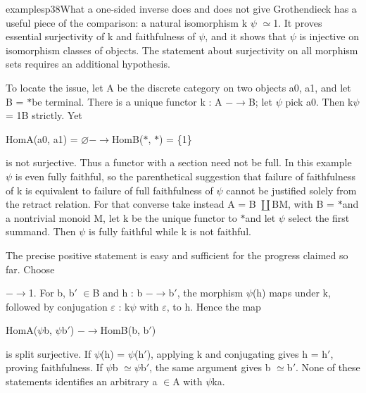 \begin{dcomment}{examples}{p38}{What a one-sided inverse does and does not give}
Grothendieck has a useful piece of the comparison: a natural isomorphism k\textasciimacron{} \ensuremath{\psi}\textasciimacron{} \ensuremath{\simeq}1. It proves essential surjectivity of k\textasciimacron{} and faithfulness of \ensuremath{\psi}\textasciimacron{}, and it shows that \ensuremath{\psi}\textasciimacron{} is injective on isomorphism classes of objects. The statement about surjectivity on all morphism sets requires an additional hypothesis.

To locate the issue, let A be the discrete category on two objects a0, a1, and let B = \ensuremath{*}be terminal. There is a unique functor k : A \ensuremath{-}\ensuremath{\to}B; let \ensuremath{\psi} pick a0. Then k\ensuremath{\psi} = 1B strictly. Yet

HomA(a0, a1) = \ensuremath{\varnothing}\ensuremath{-}\ensuremath{\to}HomB(\ensuremath{*}, \ensuremath{*}) = \{1\}

is not surjective. Thus a functor with a section need not be full. In this example \ensuremath{\psi} is even fully faithful, so the parenthetical suggestion that failure of faithfulness of k is equivalent to failure of full faithfulness of \ensuremath{\psi} cannot be justified solely from the retract relation. For that converse take instead A = B \ensuremath{\coprod}BM, with B = \ensuremath{*}and a nontrivial monoid M, let k be the unique functor to \ensuremath{*}and let \ensuremath{\psi} select the first summand. Then \ensuremath{\psi} is fully faithful while k is not faithful.

The precise positive statement is easy and sufficient for the progress claimed so far. Choose

\ensuremath{-}\ensuremath{\to}1. For b, b\ensuremath{\prime} \ensuremath{\in}B and h : b \ensuremath{-}\ensuremath{\to}b\ensuremath{\prime}, the morphism \ensuremath{\psi}(h) maps under k, followed by conjugation \ensuremath{\varepsilon} : k\ensuremath{\psi} with \ensuremath{\varepsilon}, to h. Hence the map

HomA(\ensuremath{\psi}b, \ensuremath{\psi}b\ensuremath{\prime}) \ensuremath{-}\ensuremath{\to}HomB(b, b\ensuremath{\prime})

is split surjective. If \ensuremath{\psi}(h) = \ensuremath{\psi}(h\ensuremath{\prime}), applying k and conjugating gives h = h\ensuremath{\prime}, proving faithfulness. If \ensuremath{\psi}b \ensuremath{\simeq}\ensuremath{\psi}b\ensuremath{\prime}, the same argument gives b \ensuremath{\simeq}b\ensuremath{\prime}. None of these statements identifies an arbitrary a \ensuremath{\in}A with \ensuremath{\psi}ka.


\end{dcomment}
